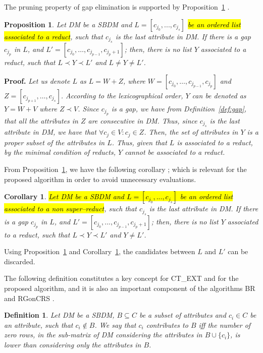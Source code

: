 \documentclass[number,preprint,review,12pt]{elsarticle}
\newtheorem{proposition}{Proposition}
\newtheorem{definition}{Definition}
\newtheorem{corollary}{Corollary}
\begin{document}
	The pruning property of gap elimination is supported by Proposition~\ref{prop:gap} \citep{Santiesteban03}. 
		
	\begin{proposition}\label{prop:gap} 
		Let DM be a SBDM and $L = [c_{j_0},...,c_{j_s}]$ \hl{be an ordered list associated to a reduct}, such that $c_{j_s}$ is the last attribute in DM. If there is a gap $c_{j_p}$ in $L$, and $L'=[c_{j_0},\dots,c_{j_{p-1}},c_{j_p+1}]$; then, there is no list $Y$ associated to a reduct, such that $L \prec Y \prec L'$ and $L \neq Y \neq L'$.
	\end{proposition}	
	
	\noindent
	\textbf{Proof.} \textit{\label{proof:gap} 
	Let us denote $L$ as $L=W+Z$, where $W=[c_{j_0},\dots,c_{j_{p-1}}, c_{j_p}]$ and $Z=[c_{j_{p+1}}, \dots, c_{j_s}]$. According to the lexicographical order, $Y$ can be denoted as $Y=W+V$ where $Z \prec V$. Since $c_{j_p}$ is a gap, we have from Definition~\ref{def:gap}, that all the attributes in $Z$ are consecutive in DM. Thus, since $c_{j_s}$ is the last attribute in DM, we have that $\forall c_j \in V: c_j \in Z$. Then, the set of attributes in $Y$ is a proper subset of the attributes in $L$. Thus, given that $L$ is associated to a reduct, by the minimal condition of reducts, $Y$ cannot be associated to a reduct.}
	
	From Proposition~\ref{prop:gap}, we have the following corollary \citep{Santiesteban03}; which is relevant for the proposed algorithm in order to avoid unnecessary evaluations.
	
	\begin{corollary}\label{coro:gap} 
	  \hl{Let DM be a SBDM and $L = [c_{j_0},...,c_{j_s}]$ be an ordered list associated to a non super--reduct}, such that $c_{j_s}$ is the last attribute in DM. If there is a gap $c_{j_p}$ in $L$, and $L' = [c_{j_0},...,c_{j_{p-1}},c_{j_p+1}]$; then, there is no list $Y$ associated to a reduct, such that $L \prec Y \prec L'$ and $Y \neq L'$.
	\end{corollary}
	
	Using Proposition~\ref{prop:gap} and Corollary~\ref{coro:gap}, the candidates between $L$ and $L'$ can be discarded.
		
	The following definition constitutes a key concept for CT\_EXT \citep{Sanchez07} and for the proposed algorithm, and it is also an important component of the algorithms BR \citep{Lias09} and RGonCRS \citep{WangP07}.
			
	\begin{definition}\label{def:contrib}
		Let DM be a SBDM, $B \subseteq C$ be a subset of attributes and  $c_i \in C$ be an attribute, such that $c_i \notin B$. We say that $c_i$ contributes to $B$ iff the	number of zero rows, in the sub-matrix of DM considering the attributes in $B\cup\{c_i\}$, is lower than considering only the attributes in $B$.
	\end{definition}
			
\end{document}
